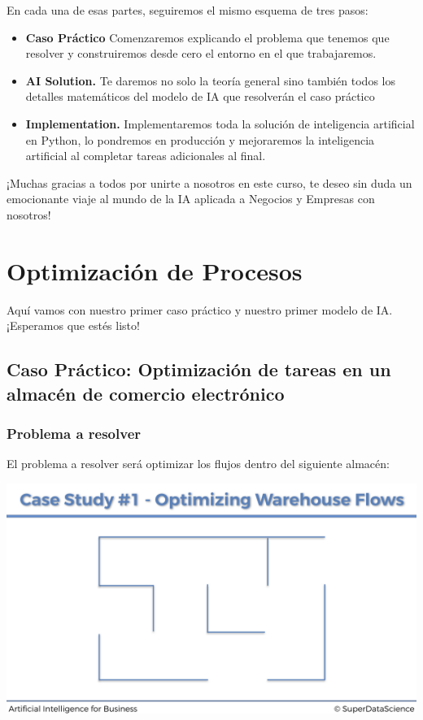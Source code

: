 \documentclass[]{book}
\providecommand{\tightlist}{%
  \setlength{\itemsep}{0pt}\setlength{\parskip}{0pt}}
\begin{document}
En cada una de esas partes, seguiremos el mismo esquema de tres pasos:

\begin{itemize}
\tightlist
\item
  \textbf{Caso Práctico} Comenzaremos explicando el problema que tenemos que resolver y construiremos desde cero el entorno en el que trabajaremos.
\item
  \textbf{AI Solution.} Te daremos no solo la teoría general sino también todos los detalles matemáticos del modelo de IA que resolverán el caso práctico
\item
  \textbf{Implementation.} Implementaremos toda la solución de inteligencia artificial en Python, lo pondremos en producción y mejoraremos la inteligencia artificial al completar tareas adicionales al final.
\end{itemize}

¡Muchas gracias a todos por unirte a nosotros en este curso, te deseo sin duda un emocionante viaje al mundo de la IA aplicada a Negocios y Empresas con nosotros!

\hypertarget{optimizaciuxf3n-de-procesos}{%
\chapter{Optimización de Procesos}\label{optimizaciuxf3n-de-procesos}}

Aquí vamos con nuestro primer caso práctico y nuestro primer modelo de IA. ¡Esperamos que estés listo!

\hypertarget{caso-pruxe1ctico-optimizaciuxf3n-de-tareas-en-un-almacuxe9n-de-comercio-electruxf3nico}{%
\section{Caso Práctico: Optimización de tareas en un almacén de comercio electrónico}\label{caso-pruxe1ctico-optimizaciuxf3n-de-tareas-en-un-almacuxe9n-de-comercio-electruxf3nico}}

\hypertarget{problema-a-resolver}{%
\subsection{Problema a resolver}\label{problema-a-resolver}}

El problema a resolver será optimizar los flujos dentro del siguiente almacén:

\includegraphics[width=1\textwidth,height=\textheight]{Images/Warehouse_1.png}
\end{document}
